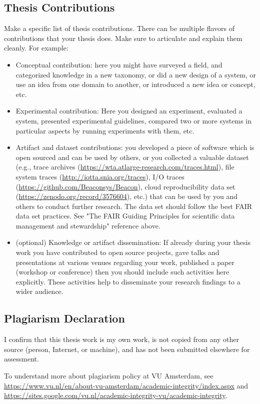 \subsection{Thesis Contributions}
Make a specific list of thesis contributions. There can be multiple flavors of contributions that your thesis does. Make sure to articulate and explain them cleanly. For example: 
\begin{itemize}
    \item Conceptual contribution: here you might have surveyed a field, and categorized knowledge in a new taxonomy, or did a new design of a system, or use an idea from one domain to another, or introduced a new idea or concept, etc. 
    \item Experimental contribution: Here you designed an experiment, evaluated a system, presented experimental guidelines, compared two or more systems in particular aspects by running experiments with them, etc. 
    \item Artifact and dataset contributions: you developed a piece of software which is open sourced and can be used by others, or you collected a valuable dataset (e.g., trace archives (\url{https://wta.atlarge-research.com/traces.html}), file system traces (\url{http://iotta.snia.org/traces}), I/O traces (\url{https://github.com/Beaconsys/Beacon}), cloud reproducibility data set  (\url{https://zenodo.org/record/3576604}), etc.) that can be used by you and others to conduct further research. The data set should follow the best FAIR data set practices. See "The FAIR Guiding Principles for scientific data management and stewardship" reference above. 
    \item (optional) Knowledge or artifact dissemination: If already during your thesis work you have contributed to open source projects, gave talks and presentations at various venues regarding your work, published a paper (workshop or conference) then you should include such activities here explicitly. These activities help to disseminate your research findings to a wider audience.
\end{itemize}

\subsection{Plagiarism Declaration}
I confirm that this thesis work is my own work, is not copied from any other source (person, Internet, or machine), and has not been submitted elsewhere for assessment. 

To understand more about plagiarism policy at VU Amsterdam, see \url{https://www.vu.nl/en/about-vu-amsterdam/academic-integrity/index.aspx} and \url{https://sites.google.com/vu.nl/academic-integrity-vu/academic-integrity}. 

